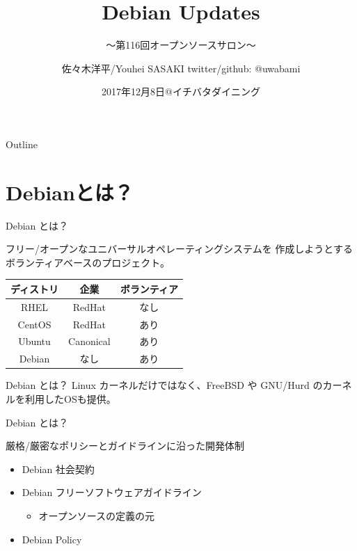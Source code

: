 \documentclass[cjk,c,squeeze,shrink,dvipdfmx,12pt]{beamer}
\title{Debian Updates}
\subtitle[]{〜第116回オープンソースサロン〜}
\author[佐々木]{%
  佐々木洋平/Youhei SASAKI\newline
  twitter/github: \alert{@uwabami}
}
\institute[Debian JP Project]{%
  Debian JP Project/関西Debian勉強会\\
  {\color{blue}{uwabami@debian.or.jp}}
}
\date[2017/12/08]{%
  {\footnotesize{2017年12月8日@イチバタダイニング}}
}
\begin{document}
\takahashi[80]{　}
{%
  \begin{frame}
    \maketitle
  \end{frame}
}

\begin{frame}[fragile]{Outline}
  \tableofcontents
\end{frame}

\section{Debianとは？}

\begin{frame}[fragile]{Debian とは？}

  \alert{フリー/オープン}な\alert{ユニバーサル}オペレーティングシステムを
  作成しようとするボランティアベースのプロジェクト。

  \vfill
  \centering
  \begin{tabular}{|c|c|c|}
    \hline
    ディストリ & 企業 & ボランティア \\ \hline
    RHEL & RedHat & なし  \\ \hline
    CentOS & RedHat & あり \\ \hline
    Ubuntu  & Canonical & あり \\ \hline
    \alert{Debian}  & \alert{なし} & \alert{あり} \\ \hline
  \end{tabular}
  \vfill
\end{frame}


\begin{frame}[fragile]{Debian とは？}
Linux カーネルだけではなく、FreeBSD や GNU/Hurd のカーネルを利用したOSも提供。

\centering
\end{frame}


\begin{frame}[fragile]{Debian とは？}

  厳格/厳密なポリシーとガイドラインに沿った開発体制
  \begin{itemize}
  \item Debian 社会契約
  \item Debian フリーソフトウェアガイドライン
    \begin{itemize}
    \item オープンソースの定義の元
    \end{itemize}
  \item Debian Policy
  \end{itemize}

\end{frame}
\end{document}
